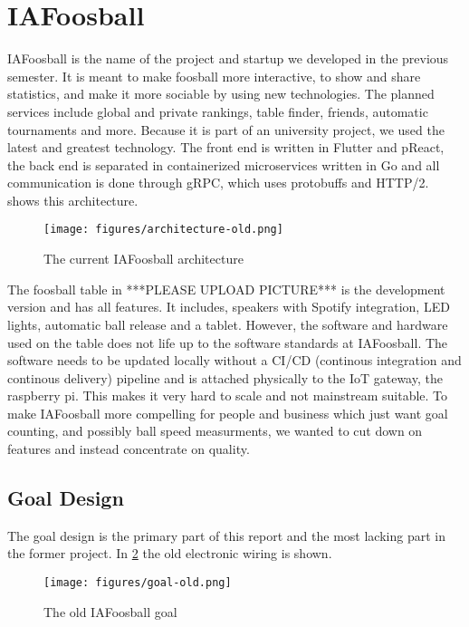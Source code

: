 \section{IAFoosball}
IAFoosball is the name of the project and startup we developed in the previous semester. It is meant to make foosball more interactive, to show and share statistics, and make it more sociable by using new technologies. The planned services include global and private rankings, table finder, friends, automatic tournaments and more. Because it is part of an university project, we used the latest and greatest technology. The front end is written in Flutter and pReact, the back end is separated in containerized microservices written in Go and all communication is done through gRPC, which uses protobuffs and HTTP/2.  shows this architecture.

\begin{figure}[h!]
    \centering
    \texttt{[image: figures/architecture-old.png]}%
    \caption{The current IAFoosball architecture}\label{fig:architectureCurr}
\end{figure}

The foosball table in ***PLEASE UPLOAD PICTURE***%
is the development version and has all features. It includes, speakers with Spotify integration, LED lights, automatic ball release and a tablet. However, the software and hardware used on the table does not life up to the software standards at IAFoosball. The software needs to be updated locally without a CI/CD (continous integration and continous delivery) pipeline and is attached physically to the IoT gateway, the raspberry pi. This makes it very hard to scale and not mainstream suitable. To make IAFoosball more compelling for people and business which just want goal counting, and possibly ball speed measurments, we wanted to cut down on features and instead concentrate on quality.\\


\subsection{Goal Design}
The goal design is the primary part of this report and the most lacking part in the former project. 
In \cref{fig:goalOld} the old electronic wiring is shown.

\begin{figure}[h!]
    \centering
    \texttt{[image: figures/goal-old.png]}
    \caption{The old IAFoosball goal}\label{fig:goalOld}
\end{figure}

